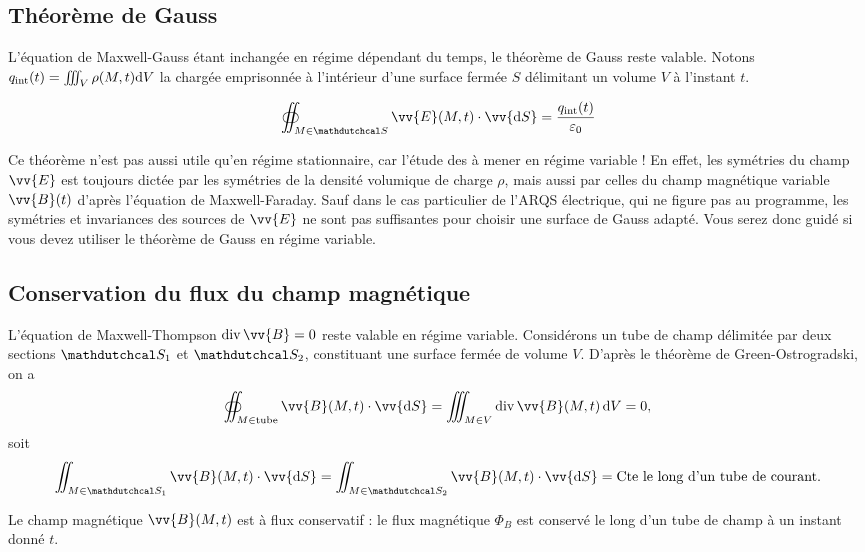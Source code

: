 \documentclass[12pt,fancy]{cours}
\begin{document}
\subsection{Théorème de Gauss}
L'équation de Maxwell-Gauss étant inchangée en régime dépendant du temps, le théorème de Gauss reste valable. Notons $q_{\rm{int}}(t)=\iiint_{V}\rho(M,t)\mathrm{d} V$ la chargée emprisonnée à l'intérieur d’une surface fermée $S$ délimitant un volume $V$ à l'instant $t$.
\begin{theorem}\label{form:gauss}
\begin{equation*}
\oiint_{M\in\Surf}\vv{E}(M,t)\cdot\vv{\d S}=\frac{q_{\rm{int}}(t)}{\varepsilon_0}
\end{equation*}
\end{theorem}

\begin{remarque}
  Ce théorème n'est pas aussi utile qu'en régime stationnaire, car l'étude des  à mener en régime variable ! En effet, les symétries du champ $\vv{E}$ est  toujours dictée par les symétries de la densité volumique de charge $\rho$, mais aussi par celles du champ magnétique variable~$\vv{B}(t)$  d'après l'équation de Maxwell-Faraday.
Sauf dans le cas particulier de  l'ARQS électrique, qui ne figure pas au programme, les symétries et invariances des sources de $\vv{E}$ ne sont pas suffisantes pour choisir une surface de Gauss adapté. Vous serez donc guidé si vous devez utiliser le théorème de Gauss en régime variable.
\end{remarque}


\subsection{Conservation du flux du champ magnétique}
L’équation de Maxwell-Thompson $\dive{\vv{B}}=0$ reste valable en régime variable. Considérons un tube de champ délimitée par deux sections $\Surf_1$ et $\Surf_2$, constituant une surface fermée de volume $V$. D'après le théorème de Green-Ostrogradski, on a 
\begin{equation}
\oiint_{M\in \text{tube}}\vv{B}(M,t)\cdot\vv{\d S}= \iiint_{M\in V} \dive{\vv{B}}(M,t)\,\d V= 0,
\end{equation}
soit
\begin{equation}\iint_{M\in\Surf_1}\vv{B}(M,t)\cdot\vv{\d S}=\iint_{M\in\Surf_2}\vv{B}(M,t)\cdot\vv{\d S} = \cte \text{ le long d’un tube de courant}.
\end{equation}
\begin{prop}\label{prop:}
Le champ magnétique $\vv{B}(M,t)$ est à flux conservatif : le flux magnétique $\Phi_B$ est conservé le long d’un tube de champ à un instant donné $t$.
\end{prop}
\end{document}
